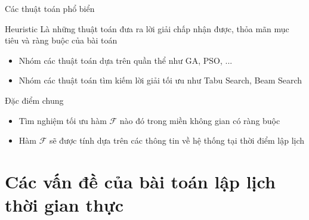 \documentclass[11pt,xcolor={dvipsnames}, aspectratio=169]{beamer}
\begin{document}
\begin{frame}
{Các thuật toán phổ biển}
\begin{block}
{Heuristic}
Là những thuật toán đưa ra lời giải chấp nhận được, thỏa mãn mục tiêu và ràng buộc của bài toán 
\begin{itemize}
	\item Nhóm các thuật toán dựa trên quần thể như GA, PSO, ...
	\item Nhóm các thuật toán tìm kiếm lời giải tối ưu như Tabu Search, Beam Search
\end{itemize} 
\end{block}
\begin{block}
{Đặc điểm chung}
\begin{itemize}
	\item Tìm nghiệm tối ưu hàm $\mathcal{F}$ nào đó trong miền không gian có ràng buộc
	\item Hàm $\mathcal{F}$ sẽ được tính dựa trên các thông tin về hệ thống tại thời điểm lập lịch
\end{itemize}
\end{block}
\end{frame}

\section{Các vấn đề của bài toán lập lịch thời gian thực}
\end{document}
